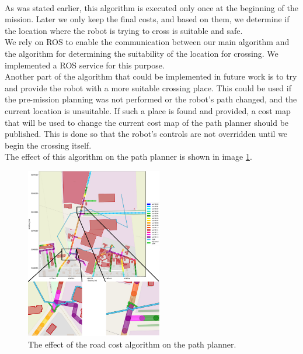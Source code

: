         \\
            As was stated earlier, this algorithm is executed only once at the beginning of the mission. Later we only keep the final costs, and based on them, we determine if the location where the robot is trying to cross is suitable and safe.\\
            We rely on ROS to enable the communication between our main algorithm and the algorithm for determining the suitability of the location for crossing. We implemented a ROS service for this purpose.\\
            Another part of the algorithm that could be implemented in future work is to try and provide the robot with a more suitable crossing place. This could be used if the pre-mission planning was not performed or the robot's path changed, and the current location is unsuitable. If such a place is found and provided, a cost map that will be used to change the current cost map of the path planner should be published. This is done so that the robot's controls are not overridden until we begin the crossing itself.\\
            The effect of this algorithm on the path planner is shown in image \ref{fig:path}.
            \begin{figure}[ht]
                \centering
                \includegraphics[width=0.53\textwidth]{images/path.png}
                \caption{The effect of the road cost algorithm on the path planner.}
                \label{fig:path}
            \end{figure}

